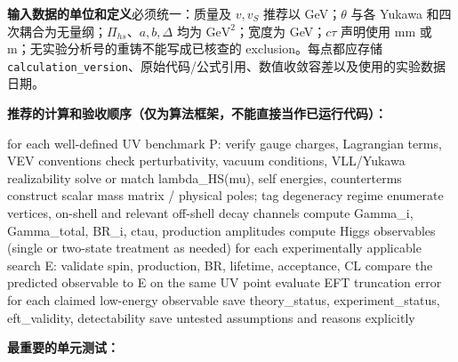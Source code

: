 \documentclass[
]{article}
\newenvironment{Shaded}{}{}
\newcommand{\NormalTok}[1]{#1}
\begin{document}
\textbf{输入数据的单位和定义}必须统一：质量及 \(v,v_S\) 推荐以
GeV；\(\theta\) 与各 Yukawa
和四次耦合为无量纲；\(\Pi_{hs}\)、\(a,b,\Delta\) 均为
\(\mathrm{GeV}^2\)；宽度为 GeV；\(c\tau\) 声明使用 mm 或
m；无实验分析号的重铸不能写成已核查的 exclusion。每点都应存储
\texttt{calculation\_version}、原始代码/公式引用、数值收敛容差以及使用的实验数据日期。

\textbf{推荐的计算和验收顺序（仅为算法框架，不能直接当作已运行代码）：}

\begin{Shaded}
\begin{Highlighting}[]
\NormalTok{for each well{-}defined UV benchmark P:}
\NormalTok{    verify gauge charges, Lagrangian terms, VEV conventions}
\NormalTok{    check perturbativity, vacuum conditions, VLL/Yukawa realizability}
\NormalTok{    solve or match lambda\_HS(mu), self energies, counterterms}
\NormalTok{    construct scalar mass matrix / physical poles; tag degeneracy regime}
\NormalTok{    enumerate vertices, on{-}shell and relevant off{-}shell decay channels}
\NormalTok{    compute Gamma\_i, Gamma\_total, BR\_i, ctau, production amplitudes}
\NormalTok{    compute Higgs observables (single or two{-}state treatment as needed)}
\NormalTok{    for each experimentally applicable search E:}
\NormalTok{        validate spin, production, BR, lifetime, acceptance, CL}
\NormalTok{        compare the predicted observable to E on the same UV point}
\NormalTok{    evaluate EFT truncation error for each claimed low{-}energy observable}
\NormalTok{    save theory\_status, experiment\_status, eft\_validity, detectability}
\NormalTok{    save untested assumptions and reasons explicitly}
\end{Highlighting}
\end{Shaded}

\textbf{最重要的单元测试：}
\end{document}
